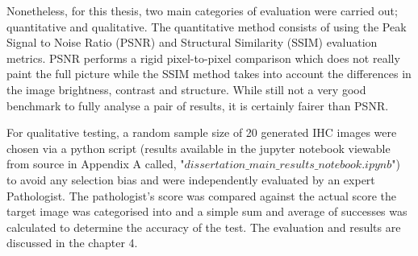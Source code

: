 Nonetheless, for this thesis, two main categories of evaluation were carried out; quantitative and qualitative. The quantitative method consists of using the Peak Signal to Noise Ratio (PSNR) and Structural Similarity (SSIM) evaluation metrics. PSNR performs a rigid pixel-to-pixel comparison which does not really paint the full picture while the SSIM method takes into account the differences in the image brightness, contrast and structure. While still not a very good benchmark to fully analyse a pair of results, it is certainly fairer than PSNR.

For qualitative testing, a random sample size of 20 generated IHC images were chosen via a python script (results available in the jupyter notebook viewable from source in Appendix A called, "$dissertation\_main\_results\_notebook.ipynb$") to avoid any selection bias and were independently evaluated by an expert Pathologist. The pathologist's score was compared against the actual score the target image was categorised into and a simple sum and average of successes was calculated to determine the accuracy of the test. The evaluation and results are discussed in the chapter 4.

